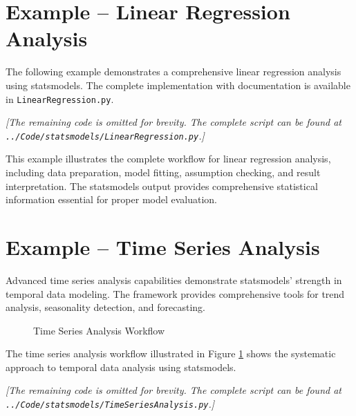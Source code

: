 \section{Example -- Linear Regression Analysis}
\label{sec:linear_example}

The following example demonstrates a comprehensive linear regression analysis using statsmodels. The complete implementation with documentation is available in \texttt{LinearRegression.py}.



\noindent\textit{[The remaining code is omitted for brevity. The complete script can be found at \texttt{../Code/statsmodels/LinearRegression.py}.]}

This example illustrates the complete workflow for linear regression analysis, including data preparation, model fitting, assumption checking, and result interpretation. The statsmodels output provides comprehensive statistical information essential for proper model evaluation.

\section{Example -- Time Series Analysis}
\label{sec:timeseries_example}

Advanced time series analysis capabilities demonstrate statsmodels' strength in temporal data modeling. The framework provides comprehensive tools for trend analysis, seasonality detection, and forecasting.

\clearpage

\begin{figure}[htbp]
	\centering
    
	\caption{Time Series Analysis Workflow}
	\label{fig:timeseries_flow}
\end{figure}

The time series analysis workflow illustrated in Figure \ref{fig:timeseries_flow} shows the systematic approach to temporal data analysis using statsmodels.



\noindent\textit{[The remaining code is omitted for brevity. The complete script can be found at \texttt{../Code/statsmodels/TimeSeriesAnalysis.py}.]}

